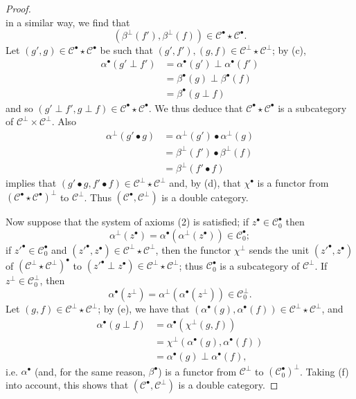 \documentclass[a4paper,fleqn]{article}
\theoremstyle{plain}
\theoremstyle{definition}
\newcommand{\CC}{\mathcal{C}}
\newcommand{\smallbullet}{\bullet}
\begin{document}
\begin{proof}
\[  \]
  in a similar way, we find that
  \[
    (\beta^\perp(f'),\beta^\perp(f))\in\CC^\smallbullet\star\CC^\smallbullet.
  \]
  Let $(g',g)\in\CC^\smallbullet\star\CC^\smallbullet$ be such that $(g',f'),(g,f)\in\CC^\perp\star\CC^\perp$;
  by (c),
  \[
    \begin{aligned}
      \alpha^\smallbullet(g'\perp f')
      &= \alpha^\smallbullet(g')\perp\alpha^\smallbullet(f')
    \\&= \beta^\smallbullet(g)\perp\beta^\smallbullet(f)
    \\&= \beta^\smallbullet(g\perp f)
    \end{aligned}
  \]
  and so $(g'\perp f',g\perp f)\in\CC^\smallbullet\star\CC^\smallbullet$.
  We thus deduce that $\CC^\smallbullet\star\CC^\smallbullet$ is a subcategory of $\CC^\perp\times\CC^\perp$.
  Also
  \[
    \begin{aligned}
      \alpha^\perp(g'\smallbullet g)
      &= \alpha^\perp(g')\smallbullet\alpha^\perp(g)
    \\&= \beta^\perp(f')\smallbullet\beta^\perp(f)
    \\&= \beta^\perp(f'\smallbullet f)
    \end{aligned}
  \]
  implies that $(g'\smallbullet g,f'\smallbullet f)\in\CC^\perp\star\CC^\perp$ and, by (d), that $\chi^\smallbullet$ is a functor from $(\CC^\smallbullet\star\CC^\smallbullet)^\perp$ to $\CC^\perp$.
  Thus $(\CC^\smallbullet,\CC^\perp)$ is a double category.

  Now suppose that the system of axioms (2) is satisfied;
  if $z^\smallbullet\in\CC_0^\smallbullet$ then
  \[
    \alpha^\perp(z^\smallbullet)
    =\alpha^\smallbullet(\alpha^\perp(z^\smallbullet))
    \in\CC_0^\smallbullet;
  \]
  if $z'^\smallbullet\in\CC_0^\smallbullet$ and $(z'^\smallbullet,z^\smallbullet)\in\CC^\perp\star\CC^\perp$, then the functor $\chi^\perp$ sends the unit $(z'^\smallbullet,z^\smallbullet)$ of $(\CC^\perp\star\CC^\perp)^\smallbullet$ to $(z'^\smallbullet\perp z^\smallbullet)\in\CC^\perp\star\CC^\perp$;
  thus $\CC_0^\smallbullet$ is a subcategory of $\CC^\perp$.
  If $z^\perp\in\CC_0^\perp$, then
  \[
    \alpha^\smallbullet(z^\perp)
    = \alpha^\perp(\alpha^\smallbullet(z^\perp))
    \in \CC_0^\perp.
  \]
  Let $(g,f)\in\CC^\perp\star\CC^\perp$;
  by (e), we have that $(\alpha^\smallbullet(g),\alpha^\smallbullet(f))\in\CC^\perp\star\CC^\perp$, and
  \[
    \begin{aligned}
      \alpha^\smallbullet(g\perp f)
      &= \alpha^\smallbullet(\chi^\perp(g,f))
    \\&= \chi^\perp(\alpha^\smallbullet(g),\alpha^\smallbullet(f))
    \\&= \alpha^\smallbullet(g)\perp\alpha^\smallbullet(f),
    \end{aligned}
  \]
  i.e. $\alpha^\smallbullet$ (and, for the same reason, $\beta^\smallbullet$) is a functor from $\CC^\perp$ to $(\CC_0^\smallbullet)^\perp$.
  Taking (f) into account, this shows that $(\CC^\smallbullet,\CC^\perp)$ is a double category.


\end{proof}
\end{document}
